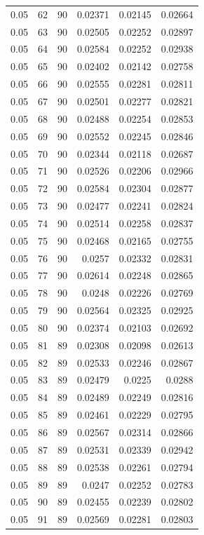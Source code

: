 \begin{tabular}{rrrrrr}
0.05 & 62 & 90 & 0.02371 & 0.02145 & 0.02664 \\
0.05 & 63 & 90 & 0.02505 & 0.02252 & 0.02897 \\
0.05 & 64 & 90 & 0.02584 & 0.02252 & 0.02938 \\
0.05 & 65 & 90 & 0.02402 & 0.02142 & 0.02758 \\
0.05 & 66 & 90 & 0.02555 & 0.02281 & 0.02811 \\
0.05 & 67 & 90 & 0.02501 & 0.02277 & 0.02821 \\
0.05 & 68 & 90 & 0.02488 & 0.02254 & 0.02853 \\
0.05 & 69 & 90 & 0.02552 & 0.02245 & 0.02846 \\
0.05 & 70 & 90 & 0.02344 & 0.02118 & 0.02687 \\
0.05 & 71 & 90 & 0.02526 & 0.02206 & 0.02966 \\
0.05 & 72 & 90 & 0.02584 & 0.02304 & 0.02877 \\
0.05 & 73 & 90 & 0.02477 & 0.02241 & 0.02824 \\
0.05 & 74 & 90 & 0.02514 & 0.02258 & 0.02837 \\
0.05 & 75 & 90 & 0.02468 & 0.02165 & 0.02755 \\
0.05 & 76 & 90 & 0.0257 & 0.02332 & 0.02831 \\
0.05 & 77 & 90 & 0.02614 & 0.02248 & 0.02865 \\
0.05 & 78 & 90 & 0.0248 & 0.02226 & 0.02769 \\
0.05 & 79 & 90 & 0.02564 & 0.02325 & 0.02925 \\
0.05 & 80 & 90 & 0.02374 & 0.02103 & 0.02692 \\
0.05 & 81 & 89 & 0.02308 & 0.02098 & 0.02613 \\
0.05 & 82 & 89 & 0.02533 & 0.02246 & 0.02867 \\
0.05 & 83 & 89 & 0.02479 & 0.0225 & 0.0288 \\
0.05 & 84 & 89 & 0.02489 & 0.02249 & 0.02816 \\
0.05 & 85 & 89 & 0.02461 & 0.02229 & 0.02795 \\
0.05 & 86 & 89 & 0.02567 & 0.02314 & 0.02866 \\
0.05 & 87 & 89 & 0.02531 & 0.02339 & 0.02942 \\
0.05 & 88 & 89 & 0.02538 & 0.02261 & 0.02794 \\
0.05 & 89 & 89 & 0.0247 & 0.02252 & 0.02783 \\
0.05 & 90 & 89 & 0.02455 & 0.02239 & 0.02802 \\
0.05 & 91 & 89 & 0.02569 & 0.02281 & 0.02803 \\

\end{tabular}
